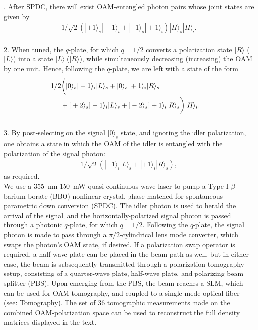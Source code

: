 \documentclass[12pt]{iopart}
\begin{document}
. After SPDC, there will exist OAM-entangled photon pairs whose joint states are given by
\begin{eqnarray}\label{eq:genpsi}
	1/\sqrt{2}\left(|+1\rangle_s |-1\rangle_i + |-1\rangle_s |+1\rangle_i \right)|H\rangle_s|H\rangle_i.
\end{eqnarray} \\
2. When tuned, the \textit{q}-plate, for which $q=1/2$ converts a polarization state $|R\rangle$ ($|L\rangle$) into a state $|L\rangle$ ($|R\rangle$), while simultaneously decreasing (increasing) the OAM by one unit. Hence, following the $q$-plate, we are left with a state of the form
\begin{eqnarray}\label{eq:genpsi}
	1/2&{\bigg(}|0\rangle_s|-1\rangle_i|L\rangle_s + |0\rangle_s|+1\rangle_i|R\rangle_s \cr 
	&+ |+2\rangle_s|-1\rangle_i|L\rangle_s + |-2\rangle_s|+1\rangle_i|R\rangle_s {\bigg)} |H\rangle_i.
\end{eqnarray} \\
3. By post-selecting on the signal $|0\rangle_s$ state, and ignoring the idler polarization, one obtains a state in which the OAM of the idler is entangled with the polarization of the signal photon:
\begin{eqnarray}\label{eq:genpsi}
	1/\sqrt{2}\left(|-1\rangle_i|L\rangle_s + |+1\rangle_i|R\rangle_s \right),
\end{eqnarray}
as required.\\

 We use a 355~nm 150~mW quasi-continuous-wave laser to pump a Type I $\beta$-barium borate (BBO) nonlinear crystal, phase-matched for spontaneous parametric down conversion (SPDC). The idler photon is used to herald the arrival of the signal, and the horizontally-polarized signal photon is passed through a photonic $q$-plate, for which $q=1/2$. Following the $q$-plate, the signal photon is made to pass through a $\pi/2$-cylindrical lens mode converter, which swaps the photon's OAM state, if desired. If a polarization swap operator is required, a half-wave plate can be placed in the beam path as well, but in either case, the beam is subsequently transmitted through a polarization tomography setup, consisting of a quarter-wave plate, half-wave plate, and polarizing beam splitter (PBS). Upon emerging from the PBS, the beam reaches a SLM, which can be used for OAM tomography, and coupled to a single-mode optical fiber (see: Tomography). The set of 36 tomographic measurements made on the combined OAM-polarization space can be used to reconstruct the full density matrices displayed in the text. 
\end{document}
